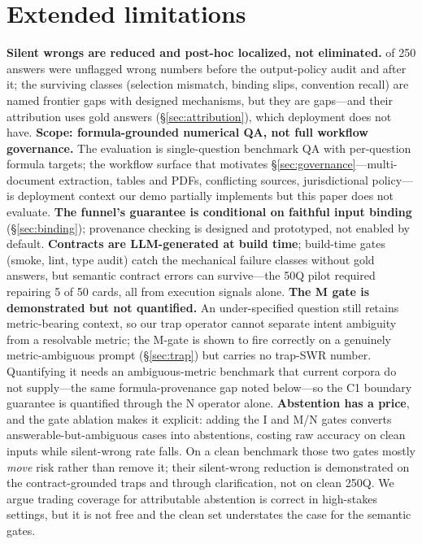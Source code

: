 \section{Extended limitations}\label{app:limitations}
\textbf{Silent wrongs are reduced and post-hoc localized, not eliminated.} \swResidual{} of 250 answers were unflagged wrong numbers before the output-policy audit and \swResidualCanon{} after it; the surviving classes (selection mismatch, binding slips, convention recall) are named frontier gaps with designed mechanisms, but they are gaps---and their attribution uses gold answers (\S\ref{sec:attribution}), which deployment does not have.
\textbf{Scope: formula-grounded numerical QA, not full workflow governance.} The evaluation is single-question benchmark QA with per-question formula targets; the workflow surface that motivates \S\ref{sec:governance}---multi-document extraction, tables and PDFs, conflicting sources, jurisdictional policy---is deployment context our demo partially implements but this paper does not evaluate.
\textbf{The funnel's guarantee is conditional on faithful input binding} (\S\ref{sec:binding}); provenance checking is designed and prototyped, not enabled by default.
\textbf{Contracts are LLM-generated at build time}; build-time gates (smoke, lint, type audit) catch the mechanical failure classes without gold answers, but semantic contract errors can survive---the 50Q pilot required repairing 5 of 50 cards, all from execution signals alone.
\textbf{The M gate is demonstrated but not quantified.} An under-specified question still retains metric-bearing context, so our trap operator cannot separate intent ambiguity from a resolvable metric; the M-gate is shown to fire correctly on a genuinely metric-ambiguous prompt (\S\ref{sec:trap}) but carries no trap-SWR number. Quantifying it needs an ambiguous-metric benchmark that current corpora do not supply---the same formula-provenance gap noted below---so the C1 boundary guarantee is quantified through the N operator alone.
\textbf{Abstention has a price}, and the gate ablation makes it explicit: adding the I and M/N gates converts answerable-but-ambiguous cases into abstentions, costing raw accuracy on clean inputs while silent-wrong rate falls. On a clean benchmark those two gates mostly \emph{move} risk rather than remove it; their silent-wrong reduction is demonstrated on the contract-grounded traps and through clarification, not on clean 250Q. We argue trading coverage for attributable abstention is correct in high-stakes settings, but it is not free and the clean set understates the case for the semantic gates.
